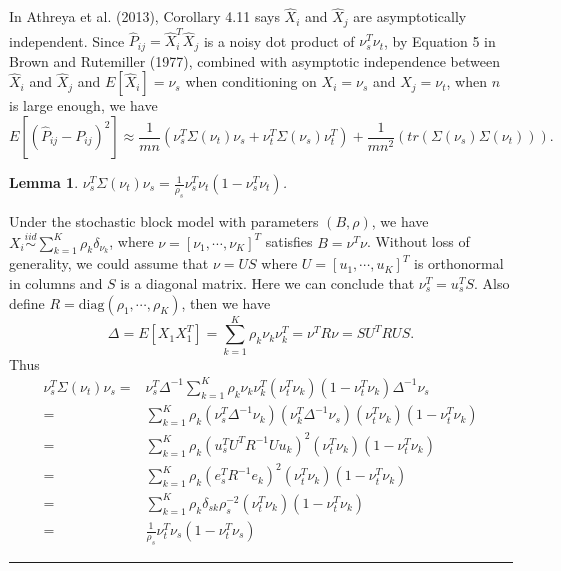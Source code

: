 \documentclass[a4paper]{article}
\newenvironment{proof}{{\bf Proof:  }}{\hfill\rule{2mm}{2mm}}
\newtheorem{lemma}[fact]{Lemma}
\begin{document}





In Athreya et al. (2013), Corollary 4.11 says $\hat{X}_i$ and $\hat{X}_j$ are asymptotically independent. Since $\hat{P}_{ij} = \hat{X}_i^T \hat{X}_j$ is a noisy dot product of $\nu_s^T \nu_t$, by Equation 5 in Brown and Rutemiller (1977), combined with asymptotic independence between $\hat{X}_i$ and $\hat{X}_j$ and $E[\hat{X}_i] = \nu_s$ when conditioning on $X_i = \nu_s$ and $X_j = \nu_t$, when $n$ is large enough, we have
\begin{equation}
\label{eqn:1}
	E[(\hat{P}_{ij} - P_{ij})^2] \approx
    \frac{1}{m n} \left( \nu_s^T \Sigma(\nu_t) \nu_s + \nu_t^T \Sigma(\nu_s) \nu_t^T \right)
    + \frac{1}{m n^2} \left( tr(\Sigma(\nu_s) \Sigma(\nu_t)) \right).
\end{equation}


\begin{lemma}
\label{lemma:1}
$\nu_s^T \Sigma(\nu_t) \nu_s = \frac{1}{\rho_s} \nu_s^T \nu_t (1- \nu_s^T \nu_t)$.
\end{lemma}
\begin{proof}
Under the stochastic block model with parameters $(B, \rho)$, we have $X_i \stackrel{iid}{\sim} \sum_{k=1}^K \rho_k \delta_{\nu_k}$, where $\nu = [\nu_1, \cdots, \nu_K]^T$ satisfies $B = \nu^T \nu$. Without loss of generality, we could assume that $\nu = U S$ where $U = [u_1, \cdots, u_K]^T$ is orthonormal in columns and $S$ is a diagonal matrix. Here we can conclude that $\nu_s^T = u_s^T S$. Also define $R = \text{diag}(\rho_1, \cdots, \rho_K)$, then we have
\[
	\Delta = E[X_1 X_1^T] = \sum_{k=1}^K \rho_k \nu_k \nu_k^T = \nu^T R \nu = S U^T R U S.
\]
Thus
\begin{align*}
	\nu_s^T \Sigma(\nu_t) \nu_s = &
    \nu_s^T \Delta^{-1} \sum_{k=1}^K \rho_k \nu_k \nu_k^T (\nu_t^T \nu_k)(1 - \nu_t^T \nu_k) \Delta^{-1} \nu_s \\
    = & \sum_{k=1}^K \rho_k (\nu_s^T \Delta^{-1} \nu_k) (\nu_k^T \Delta^{-1} \nu_s) (\nu_t^T \nu_k) (1 - \nu_t^T \nu_k) \\
    = & \sum_{k=1}^K \rho_k (u_s^T U^T R^{-1} U u_k)^2 (\nu_t^T \nu_k) (1 - \nu_t^T \nu_k) \\
    = & \sum_{k=1}^K \rho_k (e_s^T R^{-1} e_k)^2 (\nu_t^T \nu_k) (1 - \nu_t^T \nu_k) \\
    = & \sum_{k=1}^K \rho_k \delta_{sk} \rho_s^{-2} (\nu_t^T \nu_k) (1 - \nu_t^T \nu_k) \\
    = & \frac{1}{\rho_s} \nu_t^T \nu_s (1 - \nu_t^T \nu_s)
\end{align*}
\end{proof}
\end{document}
